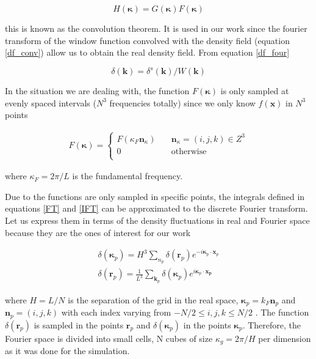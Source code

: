 \[H(\boldsymbol{\kappa}) = G(\boldsymbol{\kappa}) F(\boldsymbol{\kappa})  \]

this is known as the convolution theorem. It is used in our work since the fourier 
transform of the window function convolved with the density field (equation \ref{df_conv})
allow us to obtain the real density field. From equation \ref{df_four} 

\[\delta(\textbf{k}) = \delta^s(\textbf{k})/W(\textbf{k})\]

In the situation we are dealing with, the function $F(\boldsymbol{\kappa})$ is only
sampled at evenly spaced intervals ($N^3$ frequencies totally) since we only 
know $f(\textbf{x})$ in $N^3$ points

\begin{eqnarray*}
F(\boldsymbol{\kappa}) =\left\{ \begin{array}{cl}
F(\kappa_F\boldsymbol{n}_\kappa) \hspace{1em} & \boldsymbol{n}_\kappa = (i,j,k) \in Z^3\\
0 \hspace{1em} & \mathrm{otherwise}\\
\end{array}\right.
\end{eqnarray*} 

where $\kappa_F=2\pi/L$ is the fundamental frequency.

Due to the functions are only sampled in specific points, the integrals defined in 
equations \ref{FT} and \ref{IFT} can be approximated to the discrete Fourier transform. 
Let us express them in terms of the density fluctuations in real and Fourier space 
because they are the ones of interest for our work 

\begin{eqnarray*}
\delta(\boldsymbol{\kappa}_p) = H^3 \sum_{n_p} \delta(\boldsymbol{r}_p) e^{-i\boldsymbol{\kappa}_p\cdot \boldsymbol{x}_p} \\
\delta(\boldsymbol{r}_p) = \frac{1}{L^3}\sum_{\boldsymbol{k}_p} \delta(\boldsymbol{\kappa}_p) e^{i\boldsymbol{\kappa}_p\cdot \boldsymbol{x_p}} 
\end{eqnarray*} 

where $H = L/N$ is the separation of the grid in the real space, 
$\boldsymbol{\kappa}_p = k_F \textbf{n}_p$ and $ \boldsymbol{n}_p = (i,j,k)$ with each index
varying from $-N/2 \leq i,j,k \leq N/2$ . The function $\delta(\boldsymbol{r}_p)$  is sampled 
in the points $\boldsymbol{r}_p$ and $\delta(\boldsymbol{\kappa}_p)$ in the points 
$\boldsymbol{\kappa}_p$. Therefore, the Fourier space is divided into small cells, N cubes of size 
$\kappa_g = 2\pi/H$ per dimension as it was done for the simulation. 

